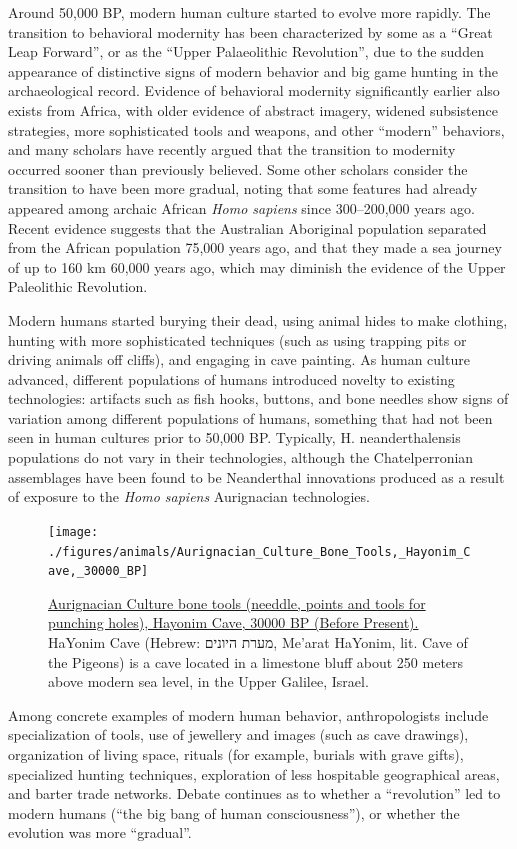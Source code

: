 Around 50,000 BP, modern human culture started to evolve more rapidly. The transition to behavioral modernity has been characterized by some as a ``Great Leap Forward'', or as the ``Upper Palaeolithic Revolution'', due to the sudden appearance of distinctive signs of modern behavior and big game hunting in the archaeological record. Evidence of behavioral modernity significantly earlier also exists from Africa, with older evidence of abstract imagery, widened subsistence strategies, more sophisticated tools and weapons, and other ``modern'' behaviors, and many scholars have recently argued that the transition to modernity occurred sooner than previously believed. Some other scholars consider the transition to have been more gradual, noting that some features had already appeared among archaic African \emph{Homo sapiens} since 300--200,000 years ago. Recent evidence suggests that the Australian Aboriginal population separated from the African population 75,000 years ago, and that they made a sea journey of up to 160 km 60,000 years ago, which may diminish the evidence of the Upper Paleolithic Revolution.

Modern humans started burying their dead, using animal hides to make clothing, hunting with more sophisticated techniques (such as using trapping pits or driving animals off cliffs), and engaging in cave painting. As human culture advanced, different populations of humans introduced novelty to existing technologies: artifacts such as fish hooks, buttons, and bone needles show signs of variation among different populations of humans, something that had not been seen in human cultures prior to 50,000 BP. Typically, H. neanderthalensis populations do not vary in their technologies, although the Chatelperronian assemblages have been found to be Neanderthal innovations produced as a result of exposure to the \emph{Homo sapiens} Aurignacian technologies.



\begin{figure}

{\centering \texttt{[image: ./figures/animals/Aurignacian\_Culture\_Bone\_Tools,\_Hayonim\_Cave,\_30000\_BP]} 

}

\caption{\href{https://commons.wikimedia.org/wiki/File:Aurignacian_Culture_Bone_Tools,_Hayonim_Cave,_30000_BP.jpg}{Aurignacian Culture bone tools (needdle, points and tools for punching holes), Hayonim Cave, 30000 BP (Before Present).} HaYonim Cave (Hebrew: מערת היונים, Me'arat HaYonim, lit. Cave of the Pigeons) is a cave located in a limestone bluff about 250 meters above modern sea level, in the Upper Galilee, Israel.}\label{fig:aurignactools}
\end{figure}

Among concrete examples of modern human behavior, anthropologists include specialization of tools, use of jewellery and images (such as cave drawings), organization of living space, rituals (for example, burials with grave gifts), specialized hunting techniques, exploration of less hospitable geographical areas, and barter trade networks. Debate continues as to whether a ``revolution'' led to modern humans (``the big bang of human consciousness''), or whether the evolution was more ``gradual''.


